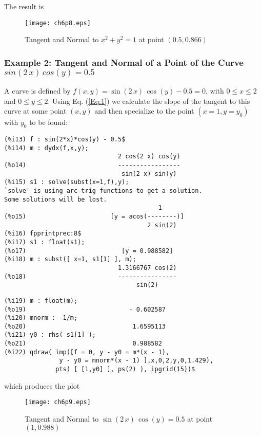 \documentclass[12pt]{article}
\begin{document}
%
\newpage
The result is
\begin{figure} [h]
   \centerline{\texttt{[image: ch6p8.eps]} }
	\caption{ Tangent and Normal to $x^2+y^2=1$ at point $(0.5,0.866)$  }
\end{figure}      


\subsubsection{Example 2: Tangent and Normal of a Point of the Curve $sin(2\,x)\,cos(y)=0.5$}
A curve is defined by $f(x,y) = \sin(2\,x)\,\cos(y) - 0.5 = 0$,
  with  $0 \leq x \leq 2$ and $0 \leq y \leq 2$.
Using Eq. (\ref{Eq:1}) we calculate the slope of the tangent to this curve at some
  point $(x,y)$ and then specialize to the point $(x=1, y=y_0)$ with $y_0$ to be found:
\small
\begin{verbatim}
(%i13) f : sin(2*x)*cos(y) - 0.5$
(%i14) m : dydx(f,x,y);
                               2 cos(2 x) cos(y)
(%o14)                         -----------------
                                sin(2 x) sin(y)
(%i15) s1 : solve(subst(x=1,f),y);
`solve' is using arc-trig functions to get a solution.
Some solutions will be lost.
                                          1
(%o15)                       [y = acos(--------)]
                                       2 sin(2)
(%i16) fpprintprec:8$
(%i17) s1 : float(s1);
(%o17)                          [y = 0.988582]
(%i18) m : subst([ x=1, s1[1] ], m);
                               1.3166767 cos(2)
(%o18)                         ----------------
                                    sin(2)
\end{verbatim}
\newpage
\begin{verbatim}
(%i19) m : float(m);
(%o19)                            - 0.602587
(%i20) mnorm : -1/m;
(%o20)                             1.6595113
(%i21) y0 : rhs( s1[1] );
(%o21)                             0.988582
(%i22) qdraw( imp([f = 0, y - y0 = m*(x - 1), 
               y - y0 = mnorm*(x - 1) ],x,0,2,y,0,1.429),
              pts( [ [1,y0] ], ps(2) ), ipgrid(15))$
\end{verbatim}
\normalsize
which produces the plot
\begin{figure} [h]
   \centerline{\texttt{[image: ch6p9.eps]} }
	\caption{ Tangent and Normal to $\sin(2\,x)\,\cos(y)=0.5$ at point $(1,0.988)$  }
\end{figure} 
\end{document}
